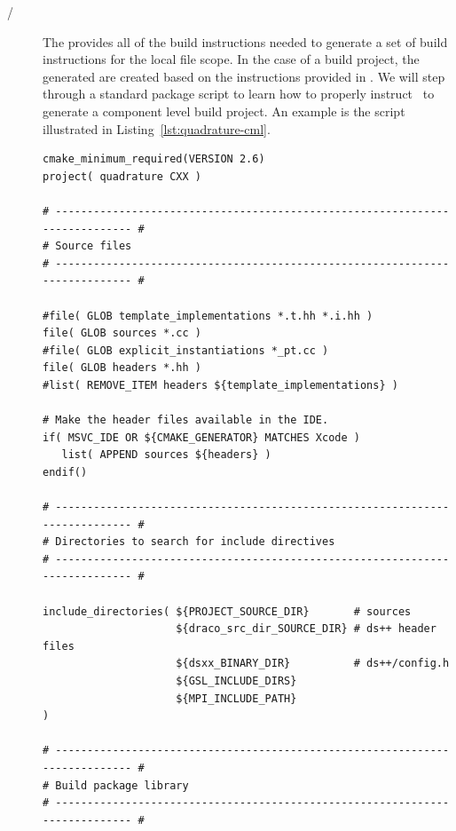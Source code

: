 \begin{description}
\item[/] The
   provides all of the build instructions needed to generate a set of build instructions for the local file scope.  In the case of a  build project, the generated  are created based on the instructions provided in .  We will step through a standard package
   script to learn how to properly instruct \cmake\ to generate a component level build project.  An example is the  
   script illustrated in Listing~\ref{lst:quadrature-cml}.
    
\begin{lstlisting}[basicstyle=\footnotesize, xleftmargin=0.0in, xrightmargin=0.0in,caption={\comp{CMakeLists.txt} file for the \pkg{quadrature} package.},label=lst:quadrature-cml,float=htp]
cmake_minimum_required(VERSION 2.6)
project( quadrature CXX )

# ---------------------------------------------------------------------------- #
# Source files
# ---------------------------------------------------------------------------- #

#file( GLOB template_implementations *.t.hh *.i.hh )
file( GLOB sources *.cc )
#file( GLOB explicit_instantiations *_pt.cc )
file( GLOB headers *.hh )
#list( REMOVE_ITEM headers ${template_implementations} )

# Make the header files available in the IDE.
if( MSVC_IDE OR ${CMAKE_GENERATOR} MATCHES Xcode )
   list( APPEND sources ${headers} )
endif()

# ---------------------------------------------------------------------------- #
# Directories to search for include directives
# ---------------------------------------------------------------------------- #

include_directories( ${PROJECT_SOURCE_DIR}       # sources
                     ${draco_src_dir_SOURCE_DIR} # ds++ header files
                     ${dsxx_BINARY_DIR}          # ds++/config.h
                     ${GSL_INCLUDE_DIRS}
                     ${MPI_INCLUDE_PATH}
)

# ---------------------------------------------------------------------------- #
# Build package library
# ---------------------------------------------------------------------------- #


\end{lstlisting}
\end{description}
